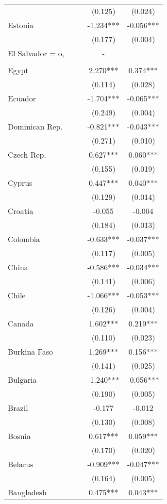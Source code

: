 \documentclass[]{article}
\begin{document}
\begin{tabular}{lcccc}
 &  &  & (0.125) & (0.024) \\
Estonia &  &  & -1.234*** & -0.056*** \\
 &  &  & (0.177) & (0.004) \\
El Salvador = o, &  &  & - &  \\
 &  &  &  &  \\
Egypt &  &  & 2.270*** & 0.374*** \\
 &  &  & (0.114) & (0.028) \\
Ecuador &  &  & -1.704*** & -0.065*** \\
 &  &  & (0.249) & (0.004) \\
Dominican Rep. &  &  & -0.821*** & -0.043*** \\
 &  &  & (0.271) & (0.010) \\
Czech Rep. &  &  & 0.627*** & 0.060*** \\
 &  &  & (0.155) & (0.019) \\
Cyprus &  &  & 0.447*** & 0.040*** \\
 &  &  & (0.129) & (0.014) \\
Croatia &  &  & -0.055 & -0.004 \\
 &  &  & (0.184) & (0.013) \\
Colombia &  &  & -0.633*** & -0.037*** \\
 &  &  & (0.117) & (0.005) \\
China &  &  & -0.586*** & -0.034*** \\
 &  &  & (0.141) & (0.006) \\
Chile &  &  & -1.066*** & -0.053*** \\
 &  &  & (0.126) & (0.004) \\
Canada &  &  & 1.602*** & 0.219*** \\
 &  &  & (0.110) & (0.023) \\
Burkina Faso &  &  & 1.269*** & 0.156*** \\
 &  &  & (0.141) & (0.025) \\
Bulgaria &  &  & -1.240*** & -0.056*** \\
 &  &  & (0.190) & (0.005) \\
Brazil &  &  & -0.177 & -0.012 \\
 &  &  & (0.130) & (0.008) \\
Bosnia &  &  & 0.617*** & 0.059*** \\
 &  &  & (0.170) & (0.020) \\
Belarus &  &  & -0.909*** & -0.047*** \\
 &  &  & (0.164) & (0.005) \\
Bangladesh &  &  & 0.475*** & 0.043*** \\

\end{tabular}
\end{document}

